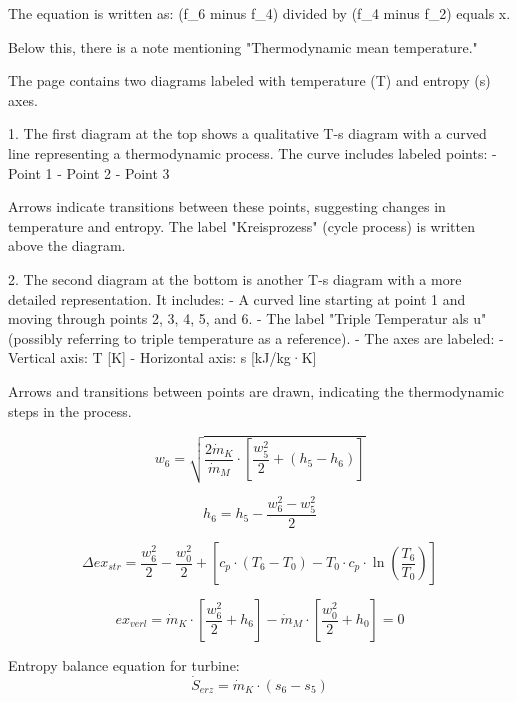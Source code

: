 The equation is written as:  
(f_6 minus f_4) divided by (f_4 minus f_2) equals x.  

Below this, there is a note mentioning "Thermodynamic mean temperature."

The page contains two diagrams labeled with temperature (T) and entropy (s) axes.  

1. The first diagram at the top shows a qualitative T-s diagram with a curved line representing a thermodynamic process. The curve includes labeled points:  
   - Point 1  
   - Point 2  
   - Point 3  

Arrows indicate transitions between these points, suggesting changes in temperature and entropy. The label "Kreisprozess" (cycle process) is written above the diagram.  

2. The second diagram at the bottom is another T-s diagram with a more detailed representation. It includes:  
   - A curved line starting at point 1 and moving through points 2, 3, 4, 5, and 6.  
   - The label "Triple Temperatur als u" (possibly referring to triple temperature as a reference).  
   - The axes are labeled:  
     - Vertical axis: T [K]  
     - Horizontal axis: s [kJ/kg·K]  

Arrows and transitions between points are drawn, indicating the thermodynamic steps in the process.

\[ w_6 = \sqrt{\frac{2 \dot{m}_K}{\dot{m}_M} \cdot \left[ \frac{w_5^2}{2} + \left( h_5 - h_6 \right) \right] } \]  

\[ h_6 = h_5 - \frac{w_6^2 - w_5^2}{2} \]  

\[ \Delta ex_{str} = \frac{w_6^2}{2} - \frac{w_0^2}{2} + \left[ c_p \cdot \left( T_6 - T_0 \right) - T_0 \cdot c_p \cdot \ln \left( \frac{T_6}{T_0} \right) \right] \]  

\[ ex_{verl} = \dot{m}_K \cdot \left[ \frac{w_6^2}{2} + h_6 \right] - \dot{m}_M \cdot \left[ \frac{w_0^2}{2} + h_0 \right] = 0 \]  

Entropy balance equation for turbine:  
\[ \dot{S}_{erz} = \dot{m}_K \cdot \left( s_6 - s_5 \right) \]
